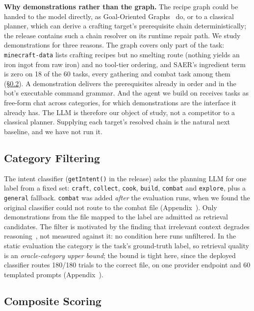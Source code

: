 \documentclass[letterpaper]{article} %
\newcommand{\secref}[1]{\S\ref{#1}}
\newcommand{\appref}[1]{Appendix~\getrefnumber{#1}}
\begin{document}
\noindent\textbf{Why demonstrations rather than the graph.}  The recipe graph
could be handed to the model directly, as Goal-Oriented
Graphs~\citep{leung2025knowledge} do, or to a classical planner, which can
derive a crafting target's prerequisite chain deterministically; the release
contains such a chain resolver on its runtime repair path.  We study
demonstrations for three reasons.  The graph covers only part of the task:
\texttt{minecraft-data} lists crafting recipes but no smelting route (nothing
yields an iron ingot from raw iron) and no tool-tier ordering, and SAER's ingredient term is zero on 18 of the 60
tasks, every gathering and combat task among them (\secref{sec:scoring}).  A demonstration delivers the prerequisites already in
order and in the bot's executable command grammar.  And the agent we build on
receives tasks as free-form chat across categories, for which demonstrations
are the interface it already has.  The LLM is therefore our object of study,
not a competitor to a classical planner.  Supplying each target's resolved chain
is the natural next baseline, and we have not run it.

\subsection{Category Filtering}
\label{sec:catfilter}

The intent classifier (\texttt{getIntent()} in the release) asks the planning
LLM for one label from a fixed set: \texttt{craft}, \texttt{collect},
\texttt{cook}, \texttt{build}, \texttt{combat} and \texttt{explore}, plus a
\texttt{general} fallback.  \texttt{combat} was added \emph{after} the
evaluation runs, when we found the original classifier could not route to the
combat file (\appref{app:intent_oracle}).  Only demonstrations from the file
mapped to the label are admitted as retrieval candidates.  The filter is
motivated by the finding that irrelevant context degrades
reasoning~\citep{shi2023large}, not measured against it: no condition here runs unfiltered.  In the static
evaluation the category is the task's ground-truth label, so retrieval quality
is an \emph{oracle-category upper bound}; the bound is tight here, since the
deployed classifier routes 180/180 trials to the correct file, on one provider
endpoint and 60 templated prompts (\appref{app:intent_oracle}).

\subsection{Composite Scoring}
\label{sec:scoring}
\end{document}
